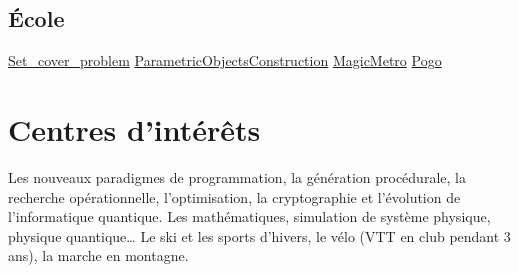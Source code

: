 \documentclass[letterpaper,10pt,sans]{moderncv}
\renewcommand{\deletedSpace}{-2mm}
\begin{document}
		\subsection{École}
				{\href{https://github.com/pinam45/UQAC_8INF870_Set_cover_problem}{Set\_cover\_problem}}
				{\href{https://github.com/pinam45/UTBM\_IN55\_ParametricObjectsConstruction}{ParametricObjectsConstruction}}
				{\href{https://github.com/TiWinDeTea/MagicMetro}{MagicMetro}}
				{\href{https://github.com/pinam45/UTBM_IA41_Pogo}{Pogo}}


	\vspace*{\deletedSpace}
	\section{Centres d'intérêts}
			{Les nouveaux paradigmes de programmation, la génération procédurale, la recherche opérationnelle, l'optimisation, la cryptographie et l'évolution de l'informatique quantique.}
			{Les mathématiques, simulation de système physique, physique quantique\ldots}
			{Le ski et les sports d'hivers, le vélo (VTT en club pendant 3 ans), la marche en montagne.}
\end{document}
